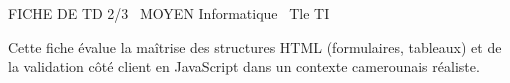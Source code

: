 \documentclass[11pt]{article}
\begin{document}
\begin{tcolorbox}[enhanced,colback=popink,colframe=popink,arc=10pt,boxrule=0pt,left=12pt,right=12pt,top=9pt,bottom=9pt]
{\color{white}\popxbold\small FICHE DE TD 2/3 \textbullet\ MOYEN \hfill Informatique \textbullet\ Tle TI\par}
\end{tcolorbox}
\vspace{4pt}
\noindent Cette fiche évalue la maîtrise des structures HTML (formulaires, tableaux) et de la validation côté client en JavaScript dans un contexte camerounais réaliste.
\end{document}
